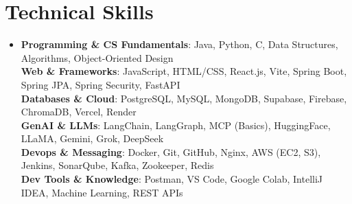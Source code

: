 \documentclass[letterpaper,11pt]{article}
\newcommand{\resumeItem}[1]{
  \item\small{
    {#1 \vspace{-2pt}}
  }
}
\newcommand{\resumeSubHeadingListStart}{\begin{itemize}[leftmargin=0.15in, label={}]}
\newcommand{\resumeSubHeadingListEnd}{\end{itemize}}
\begin{document}
\section{Technical Skills}
  \resumeSubHeadingListStart
    \resumeItem{
      \textbf{Programming \& CS Fundamentals}{: Java, Python, C, Data Structures, Algorithms, Object-Oriented Design} \\
      \textbf{Web \& Frameworks}{: JavaScript, HTML/CSS, React.js, Vite, Spring Boot, Spring JPA, Spring Security, FastAPI} \\
      \textbf{Databases \& Cloud}{: PostgreSQL, MySQL, MongoDB,  Supabase, Firebase, ChromaDB, Vercel, Render} \\
      \textbf{GenAI \& LLMs}{: LangChain, LangGraph, MCP (Basics), HuggingFace, LLaMA, Gemini, Grok, DeepSeek} \\
      \textbf{Devops \& Messaging}{: Docker, Git, GitHub, Nginx, AWS (EC2, S3), Jenkins, SonarQube, Kafka, Zookeeper, Redis} \\
      \textbf{Dev Tools \& Knowledge}{: Postman, VS Code, Google Colab,  IntelliJ IDEA, Machine Learning, REST APIs }
    }
  \resumeSubHeadingListEnd

\end{document}
